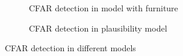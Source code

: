 \documentclass[12pt,DIV14,BCOR12mm,a4paper,footinclude=false,headinclude,parskip=half-,twoside,openright,cleardoublepage=empty,toc=index,bibliography=totoc,listof=totoc]{scrreprt}
\numberwithin{equation}{chapter}
\begin{document}
\begin{figure}[t]
\begin{subfigure}{0.45\textwidth}
        \centering
        \caption{CFAR detection in model with furniture}
    \end{subfigure}\hspace{0.5cm}
    \begin{subfigure}{0.45\textwidth}
        \centering
        \caption{CFAR detection in plausibility model}
    \end{subfigure}
    \caption{CFAR detection in different models}
    \label{cfar detection in different models}
\end{figure}
\end{document}
